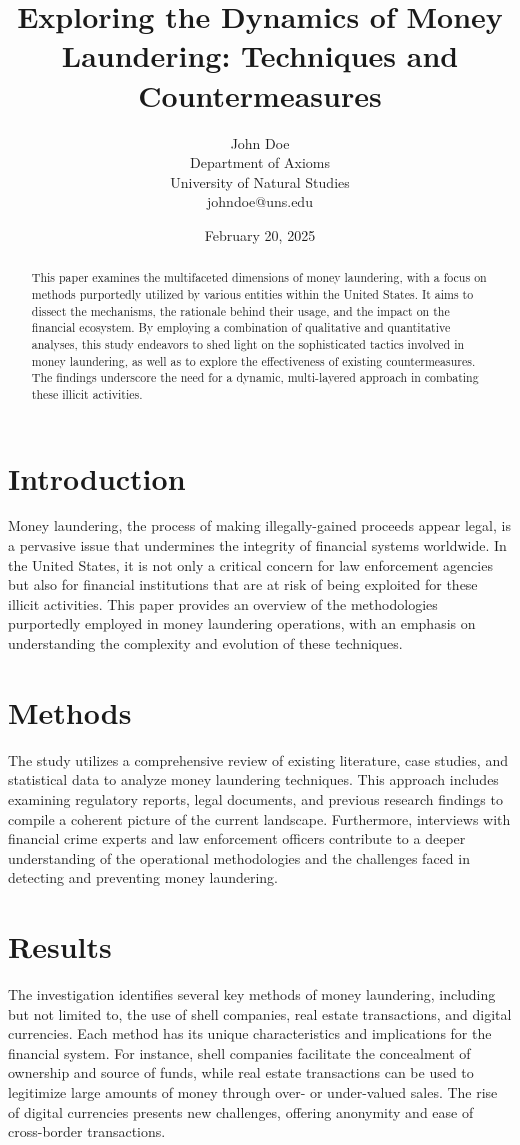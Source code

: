 \documentclass{article}
\title{Exploring the Dynamics of Money Laundering: Techniques and Countermeasures}
\author{John Doe \\ Department of Axioms \\ University of Natural Studies \\ johndoe@uns.edu}
\date{February 20, 2025}
\begin{document}
\maketitle

\begin{abstract}
This paper examines the multifaceted dimensions of money laundering, with a focus on methods purportedly utilized by various entities within the United States. It aims to dissect the mechanisms, the rationale behind their usage, and the impact on the financial ecosystem. By employing a combination of qualitative and quantitative analyses, this study endeavors to shed light on the sophisticated tactics involved in money laundering, as well as to explore the effectiveness of existing countermeasures. The findings underscore the need for a dynamic, multi-layered approach in combating these illicit activities.
\end{abstract}

\section{Introduction}
Money laundering, the process of making illegally-gained proceeds appear legal, is a pervasive issue that undermines the integrity of financial systems worldwide. In the United States, it is not only a critical concern for law enforcement agencies but also for financial institutions that are at risk of being exploited for these illicit activities. This paper provides an overview of the methodologies purportedly employed in money laundering operations, with an emphasis on understanding the complexity and evolution of these techniques.

\section{Methods}
The study utilizes a comprehensive review of existing literature, case studies, and statistical data to analyze money laundering techniques. This approach includes examining regulatory reports, legal documents, and previous research findings to compile a coherent picture of the current landscape. Furthermore, interviews with financial crime experts and law enforcement officers contribute to a deeper understanding of the operational methodologies and the challenges faced in detecting and preventing money laundering.

\section{Results}
The investigation identifies several key methods of money laundering, including but not limited to, the use of shell companies, real estate transactions, and digital currencies. Each method has its unique characteristics and implications for the financial system. For instance, shell companies facilitate the concealment of ownership and source of funds, while real estate transactions can be used to legitimize large amounts of money through over- or under-valued sales. The rise of digital currencies presents new challenges, offering anonymity and ease of cross-border transactions.
\end{document}
